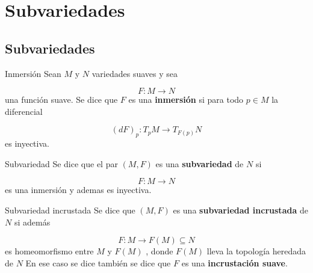 \chapter{Subvariedades}
\label{ch:teo-9}
\section{Subvariedades}
\begin{bookdefinition}{Inmersión}
Sean $M$ y $N$ variedades suaves y sea

\[
F:M\to N
\]
una función suave. Se dice que $F$ es una \textbf{inmersión} si para todo $p\in M$ la diferencial

\[
(dF)_p:T_pM\to T_{F(p)}N
\]
es inyectiva.

\end{bookdefinition}
\begin{bookdefinition}{Subvariedad}
Se dice que el par $(M,F)$ es una \textbf{subvariedad} de $N$ si

\[
F:M\to N
\]
es una inmersión y ademas es inyectiva.

\end{bookdefinition}
\begin{bookdefinition}{Subvariedad incrustada}
Se dice que $(M,F)$ es una \textbf{subvariedad incrustada} de $N$ si además

\[
F:M\to F(M)\subseteq N
\]
es homeomorfismo entre $M$ y $F(M)$ , donde $F(M)$ lleva la topología heredada de $N$ En ese caso se dice también se dice que $F$ es una \textbf{incrustación suave}.

\end{bookdefinition}
